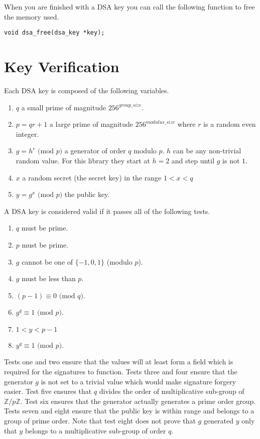 \documentclass[a4paper]{book}
\def\Z{{\mathbb Z}}
\begin{document}
When you are finished with a DSA key you can call the following function to free the memory used.
\begin{verbatim}
void dsa_free(dsa_key *key);
\end{verbatim}

\section{Key Verification}
Each DSA key is composed of the following variables.

\begin{enumerate}
  \item $q$ a small prime of magnitude $256^{group\_size}$.  
  \item $p = qr + 1$ a large prime of magnitude $256^{modulus\_size}$ where $r$ is a random even integer.
  \item $g = h^r \mbox{ (mod }p\mbox{)}$ a generator of order $q$ modulo $p$.  $h$ can be any non-trivial random 
        value.  For this library they start at $h = 2$ and step until $g$ is not $1$.
  \item $x$ a random secret (the secret key) in the range $1 < x < q$ 
  \item $y = g^x \mbox{ (mod }p\mbox{)}$ the public key.
\end{enumerate}

A DSA key is considered valid if it passes all of the following tests.

\begin{enumerate}
   \item $q$ must be prime.
   \item $p$ must be prime.
   \item $g$ cannot be one of $\lbrace -1, 0, 1 \rbrace$ (modulo $p$).
   \item $g$ must be less than $p$.
   \item $(p-1) \equiv 0 \mbox{ (mod }q\mbox{)}$.
   \item $g^q \equiv 1 \mbox{ (mod }p\mbox{)}$.
   \item $1 < y < p - 1$
   \item $y^q \equiv 1 \mbox{ (mod }p\mbox{)}$.
\end{enumerate}

Tests one and two ensure that the values will at least form a field which is required for the signatures to  
function.  Tests three and four ensure that the generator $g$ is not set to a trivial value which would make signature
forgery easier.  Test five ensures that $q$ divides the order of multiplicative sub-group of $\Z/p\Z$. Test six
ensures that the generator actually generates a prime order group.  Tests seven and eight ensure that the public key
is within range and belongs to a group of prime order.  Note that test eight does not prove that $g$ generated $y$ only
that $y$ belongs to a multiplicative sub-group of order $q$. 
\end{document}
